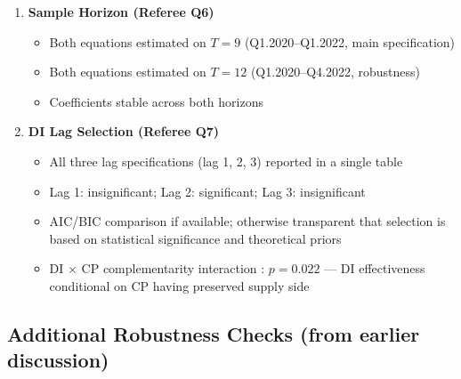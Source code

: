 \documentclass[12pt, a4paper]{article}
\begin{document}
\begin{enumerate}
\item \textbf{Sample Horizon (Referee Q6)}
\begin{itemize}
    \item Both equations estimated on $T = 9$ (Q1.2020--Q1.2022,
        main specification)
    \item Both equations estimated on $T = 12$ (Q1.2020--Q4.2022,
        robustness)
    \item Coefficients stable across both horizons
\end{itemize}

\item \textbf{DI Lag Selection (Referee Q7)}
\begin{itemize}
    \item All three lag specifications (lag 1, 2, 3) reported in a
        single table
    \item Lag 1: insignificant; Lag 2: significant; Lag 3: insignificant
    \item AIC/BIC comparison if available; otherwise transparent that
        selection is based on statistical significance and theoretical
        priors \citep{Blanchard2002, Ramey2011}
    \item DI $\times$ CP complementarity interaction
        \citep{Guerrieri2022}: $p = 0.022$ --- DI effectiveness
        conditional on CP having preserved supply side
\end{itemize}

\end{enumerate}

\subsection*{Additional Robustness Checks (from earlier discussion)}
\end{document}
